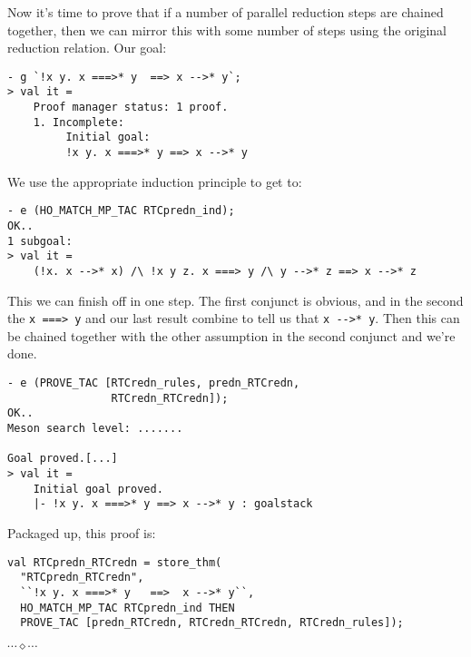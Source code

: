 \documentclass[12pt]{article}
\newcommand{\eos}{\hfill{}$\cdots\diamond\cdots$\hfill{}\vspace{5mm}}
\begin{document}
Now it's time to prove that if a number of parallel reduction steps
are chained together, then we can mirror this with some number of
steps using the original reduction relation.  Our goal:
\begin{session}\begin{verbatim}
- g `!x y. x ===>* y  ==> x -->* y`;
> val it =
    Proof manager status: 1 proof.
    1. Incomplete:
         Initial goal:
         !x y. x ===>* y ==> x -->* y
\end{verbatim}\end{session}
We use the appropriate induction principle to get to:
\begin{session}\begin{verbatim}
- e (HO_MATCH_MP_TAC RTCpredn_ind);
OK..
1 subgoal:
> val it =
    (!x. x -->* x) /\ !x y z. x ===> y /\ y -->* z ==> x -->* z
\end{verbatim}\end{session}
This we can finish off in one step.  The first conjunct is obvious,
and in the second the \verb!x ===> y! and our last result combine to
tell us that \verb!x -->* y!.  Then this can be chained together with
the other assumption in the second conjunct and we're done.
\begin{session}\begin{verbatim}
- e (PROVE_TAC [RTCredn_rules, predn_RTCredn,
                RTCredn_RTCredn]);
OK..
Meson search level: .......

Goal proved.[...]
> val it =
    Initial goal proved.
    |- !x y. x ===>* y ==> x -->* y : goalstack
\end{verbatim}\end{session}
Packaged up, this proof is:
\begin{session}\begin{verbatim}
val RTCpredn_RTCredn = store_thm(
  "RTCpredn_RTCredn",
  ``!x y. x ===>* y   ==>  x -->* y``,
  HO_MATCH_MP_TAC RTCpredn_ind THEN
  PROVE_TAC [predn_RTCredn, RTCredn_RTCredn, RTCredn_rules]);
\end{verbatim}\end{session}
\eos{}
\end{document}
